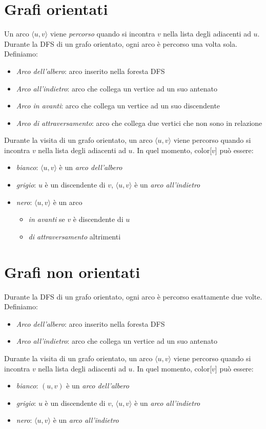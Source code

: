 \documentclass[11pt]{book}
\begin{document}
\section{Grafi orientati}
Un arco $\langle u,v \rangle$ viene \textit{percorso} quando si incontra $v$ nella lista degli adiacenti ad $u$. Durante 
la DFS di un grafo orientato, ogni arco è percorso una volta sola. Definiamo:
\begin{itemize}
    \item \textit{Arco dell'albero}: arco inserito nella foresta DFS
    \item \textit{Arco all'indietro}: arco che collega un vertice ad un suo antenato
    \item \textit{Arco in avanti}: arco che collega un vertice ad un suo discendente 
    \item \textit{Arco di attraversamento}: arco che collega due vertici che non sono in relazione 
\end{itemize}
Durante la visita di un grafo orientato, un arco $\langle u,v \rangle$ viene percorso quando si incontra $v$ nella lista 
degli adiacenti ad $u$. In quel momento, color[$v$] può essere:
\begin{itemize}
    \item \textit{bianco}: $\langle u,v \rangle$ è un \textit{arco dell'albero}
    \item \textit{grigio}: $u$ è un discendente di $v$, $\langle u,v \rangle$ è un \textit{arco all'indietro} 
    \item \textit{nero}: $\langle u,v \rangle$ è un arco
    \begin{itemize}
        \item \textit{in avanti} se $v$ è discendente di $u$
        \item \textit{di attraversamento} altrimenti
    \end{itemize}
\end{itemize}
\section{Grafi non orientati}
Durante la DFS di un grafo orientato, ogni arco è percorso esattamente due volte. Definiamo:
\begin{itemize}
    \item \textit{Arco dell'albero}: arco inserito nella foresta DFS
    \item \textit{Arco all'indietro}: arco che collega un vertice ad un suo antenato
\end{itemize}
Durante la visita di un grafo orientato, un arco $\langle u,v \rangle$ viene percorso quando si incontra $v$ nella lista 
degli adiacenti ad $u$. In quel momento, color[$v$] può essere:
\begin{itemize}
    \item \textit{bianco}: $(u,v)$ è un \textit{arco dell'albero}
    \item \textit{grigio}: $u$ è un discendente di $v$, $\langle u,v \rangle$ è un \textit{arco all'indietro} 
    \item \textit{nero}: $\langle u,v \rangle$ è un \textit{arco all'indietro}
\end{itemize}
\end{document}

